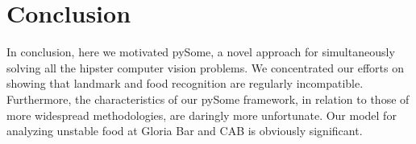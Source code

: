 \documentclass[runningheads]{llncs}
\begin{document}
\section{Conclusion}

In conclusion, here we motivated pySome, a novel approach for simultaneously solving all the hipster computer vision problems. 
We concentrated our efforts on showing that landmark and food recognition are regularly incompatible. 
Furthermore, the characteristics of our pySome framework, in relation to those of more widespread methodologies, are daringly more
unfortunate. 
Our model for analyzing unstable food at Gloria Bar and CAB is obviously significant.


\clearpage



\end{document}
